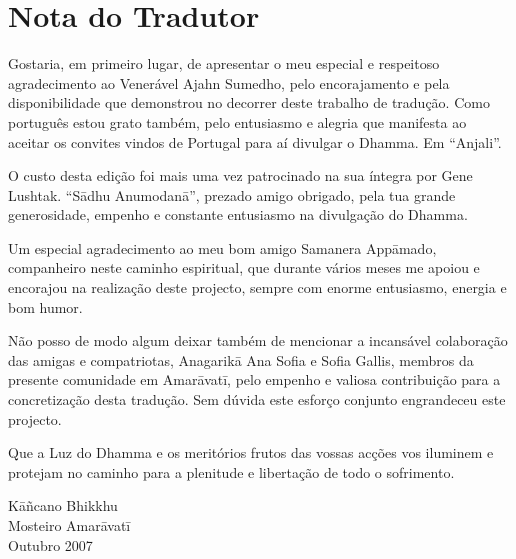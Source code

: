 \chapter{Nota do Tradutor}

Gostaria, em primeiro lugar, de apresentar o meu especial e respeitoso
agradecimento ao Venerável Ajahn Sumedho, pelo encorajamento e pela
disponibilidade que demonstrou no decorrer deste trabalho de tradução. Como
português estou grato também, pelo entusiasmo e alegria que manifesta ao aceitar
os convites vindos de Portugal para aí divulgar o Dhamma. Em “Anjali”.

O custo desta edição foi mais uma vez patrocinado na sua íntegra por Gene
Lushtak. “Sādhu Anumodanā”, prezado amigo obrigado, pela tua grande
generosidade, empenho e constante entusiasmo na divulgação do Dhamma.


Um especial agradecimento ao meu bom amigo Samanera Appāmado, companheiro neste
caminho espiritual, que durante vários meses me apoiou e encorajou na realização
deste projecto, sempre com enorme entusiasmo, energia e bom humor.

Não posso de modo algum deixar também de mencionar a incansável colaboração das
amigas e compatriotas, Anagarikā Ana Sofia e Sofia Gallis, membros da presente
comunidade em Amarāvatī, pelo empenho e valiosa contribuição para a
concretização desta tradução. Sem dúvida este esforço conjunto engrandeceu este
projecto.

\enlargethispage{2\baselineskip}

Que a Luz do Dhamma e os meritórios frutos das vossas acções vos iluminem e
protejam no caminho para a plenitude e libertação de todo o sofrimento.

\bigskip

{\raggedleft
  Kāñcano Bhikkhu\\
  Mosteiro Amarāvatī\\
  Outubro 2007
\par}

